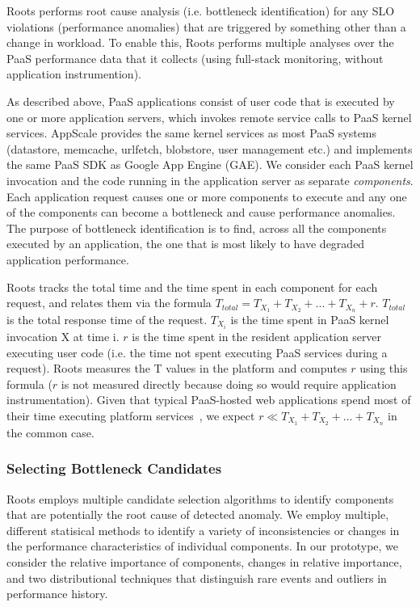 Roots performs root cause analysis (i.e. bottleneck identification) for any SLO violations (performance
anomalies) that are triggered by something other than a change in workload.
To enable this, Roots performs multiple analyses over the PaaS performance data that it
collects (using full-stack monitoring, without application instrumention).

As described above, PaaS applications 
consist of user code that is executed by one or more application servers,
which invokes remote service calls to PaaS kernel services. 
AppScale provides the same kernel services as most PaaS systems (datastore, memcache,
urlfetch, blobstore, user management etc.) and implements the same PaaS SDK as
Google App Engine (GAE).
We consider each PaaS kernel invocation and the code running in the application server as 
separate \textit{components}. Each application request causes one or more components to
execute and any one of the components can become a bottleneck and cause performance anomalies.  
The purpose of bottleneck identification is to find, across all
the components executed by an application, the one that is most likely to have 
degraded application performance.

Roots tracks the total time and the time spent in each component for each request, 
and relates them via the formula $T_{total} = T_{X_1} + T_{X_2} + ... + T_{X_n} + r$. 
$T_{total}$ is the total response time of the request. $T_{X_i}$ is the time spent in PaaS kernel
invocation X at time i.  $r$ is the time spent in the resident
application server executing user code (i.e. the time not
spent executing PaaS services during a request). Roots measures the T values in the platform and
computes $r$ using this formula ($r$ is not measured directly because doing so would require 
application instrumentation).  Given that typical PaaS-hosted web
applications spend most of their time executing platform 
services~\cite{Jayathilaka:2015:RTS:2806777.2806842},
we expect $r \ll T_{X_1} + T_{X_2} + ... + T_{X_n}$ in the common case.

\subsubsection{Selecting Bottleneck Candidates}

Roots employs multiple candidate selection algorithms to identify components that are potentially
the root cause of detected anomaly. We employ multiple, different statisical methods
to identify a variety of inconsistencies or changes in the performance characteristics of 
individual components.  In our prototype, we consider the relative importance of components, 
changes in relative importance, and two 
distributional techniques that distinguish rare events and 
outliers in performance history.

